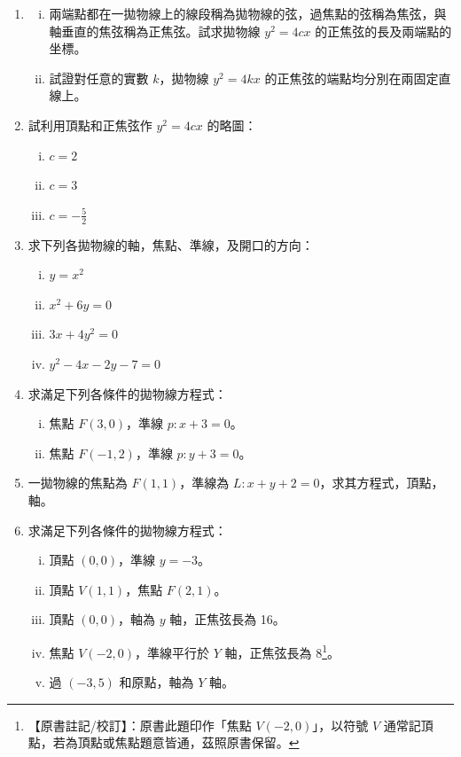\begin{enumerate}
  \item
  \begin{enumerate}[(i)]
    \item 兩端點都在一拋物線上的線段稱為拋物線的弦，過焦點的弦稱為焦弦，與軸垂直的焦弦稱為正焦弦。試求拋物線 $y^2 = 4cx$ 的正焦弦的長及兩端點的坐標。
    \item 試證對任意的實數 $k$，拋物線 $y^2 = 4kx$ 的正焦弦的端點均分別在兩固定直線上。
  \end{enumerate}

  \item 試利用頂點和正焦弦作 $y^2 = 4cx$ 的略圖：
  \begin{enumerate}[(i)]
    \item $c = 2$
    \item $c = 3$
    \item $c = -\frac{5}{2}$
  \end{enumerate}

  \item 求下列各拋物線的軸，焦點、準線，及開口的方向：
  \begin{enumerate}[(i)]
    \item $y = x^2$
    \item $x^2 + 6y = 0$
    \item $3x + 4y^2 = 0$
    \item $y^2 - 4x - 2y - 7 = 0$
  \end{enumerate}

  \item 求滿足下列各條件的拋物線方程式：
  \begin{enumerate}[(i)]
    \item 焦點 $F(3,0)$，準線 $p: x + 3 = 0$。
    \item 焦點 $F(-1,2)$，準線 $p: y + 3 = 0$。
  \end{enumerate}

  \item 一拋物線的焦點為 $F(1,1)$，準線為 $L: x + y + 2 = 0$，求其方程式，頂點，軸。

  \item[*\theenumi.] 求滿足下列各條件的拋物線方程式：
  \begin{enumerate}[(i)]
    \item 頂點 $(0,0)$，準線 $y = -3$。
    \item 頂點 $V(1,1)$，焦點 $F(2,1)$。
    \item 頂點 $(0,0)$，軸為 $y$ 軸，正焦弦長為 16。
    \item 焦點 $V(-2,0)$，準線平行於 $Y$ 軸，正焦弦長為 8\label{note:b4s-ch3-ex3-6-4}\footnote{【原書註記/校訂】：原書此題印作「焦點 $V(-2,0)$」，以符號 $V$ 通常記頂點，若為頂點或焦點題意皆通，茲照原書保留。}。
    \item 過 $(-3,5)$ 和原點，軸為 $Y$ 軸。
  \end{enumerate}


\end{enumerate}
